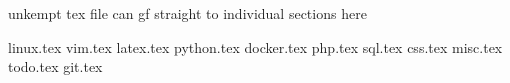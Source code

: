 unkempt tex file can gf straight to individual sections here

linux.tex
vim.tex
latex.tex
python.tex
docker.tex
php.tex
sql.tex
css.tex
misc.tex
todo.tex
git.tex
